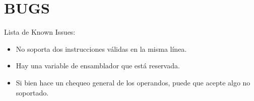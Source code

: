 \documentclass[12pt]{article}
\begin{document}
\section{BUGS}
Lista de Known Issues:
\begin{itemize}
    \item No soporta dos instrucciones v\'alidas en la misma l\'inea.
    \item Hay una variable de ensamblador que est\'a reservada.
    \item Si bien hace un chequeo general de los operandos, puede que acepte algo
            no soportado.
\end{itemize}
\end{document}
